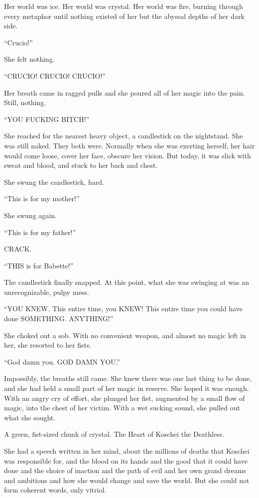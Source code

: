 Her world was ice. Her world was crystal. Her world was fire, burning through every metaphor until nothing existed of her but the abyssal depths of her dark side.

“Crucio!”

She felt nothing.

“CRUCIO! CRUCIO! CRUCIO!”

Her breath came in ragged pulls and she poured all of her magic into the pain. Still, nothing.

“YOU FUCKING BITCH!”

She reached for the nearest heavy object, a candlestick on the nightstand. She was still naked. They both were. Normally when she was exerting herself, her hair would come loose, cover her face, obscure her vision. But today, it was slick with sweat and blood, and stuck to her back and chest.

She swung the candlestick, hard.

“This is for my mother!”

She swung again.

“This is for my father!”

CRACK.

“THIS is for Babette!”

The candlestick finally snapped. At this point, what she was swinging at was an unrecognizable, pulpy mess.

“YOU KNEW. This entire time, you KNEW! This entire time you could have done SOMETHING. ANYTHING!”

She choked out a sob. With no convenient weapon, and almost no magic left in her, she resorted to her fists.

“God damn you. GOD DAMN YOU.”

Impossibly, the breaths still came. She knew there was one last thing to be done, and she had held a small part of her magic in reserve. She hoped it was enough. With an angry cry of effort, she plunged her fist, augmented by a small flow of magic, into the chest of her victim. With a wet sucking sound, she pulled out what she sought.

A green, fist-sized chunk of crystal. The Heart of Koschei the Deathless.

She had a speech written in her mind, about the millions of deaths that Koschei was responsible for, and the blood on its hands and the good that it could have done and the choice of inaction and the path of evil and her own grand dreams and ambitions and how she would change and save the world. But she could not form coherent words, only vitriol.

